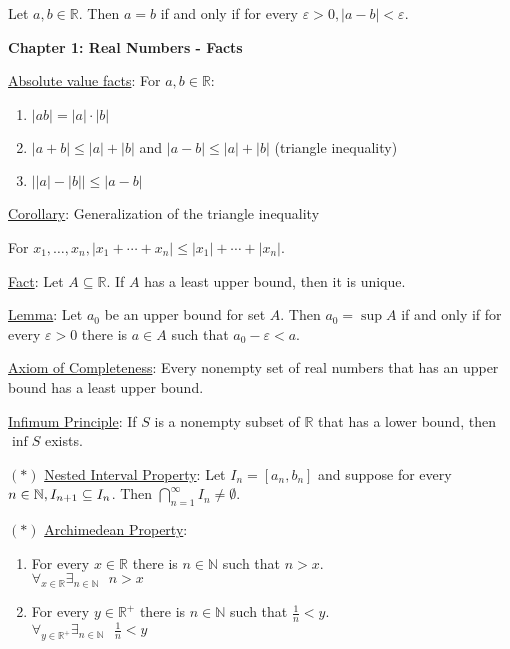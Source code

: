 \documentclass[12pt]{article}
\newcommand{\RR}{\mathbb{R}} %
\newcommand{\NN}{\mathbb{N}}
\newcommand\abs[1]{\left| #1 \right|} %
\newcommand{\eps}{\varepsilon}
\begin{document}
Let $a, b \in \RR$. Then $a = b$ if and only if for every $\eps > 0, \abs{a - b} < \eps$.

\pagebreak

\textbf{Chapter 1: Real Numbers - Facts}

\hrulefill

\underline{Absolute value facts}: For $a, b \in \RR$:
\begin{enumerate}
\item $\abs{ab} = \abs{a} \cdot \abs{b}$
\item $\abs{a + b} \le \abs{a} + \abs{b}$ and $\abs{a - b} \le \abs{a} + \abs{b}$ (triangle inequality)
\item $\abs{\abs{a} - \abs{b}} \le \abs{a - b}$
\end{enumerate}

\hrulefill

\underline{Corollary}: Generalization of the triangle inequality

For $x_1, \dots, x_n, \abs{x_1 + \cdots + x_n} \le \abs{x_1} + \cdots + \abs{x_n}$.

\hrulefill

\underline{Fact}: Let $A \subseteq \RR$. If $A$ has a least upper bound, then it is unique.

\hrulefill

\underline{Lemma}: Let $a_0$ be an upper bound for set $A$. Then $a_0 = \sup A$ if and only if for every $\eps > 0$ there is $a \in A$ such that $a_0 - \eps < a$.

\hrulefill

\underline{Axiom of Completeness}: Every nonempty set of real numbers that has an upper bound has a least upper bound.

\hrulefill

\underline{Infimum Principle}: If $S$ is a nonempty subset of $\RR$ that has a lower bound, then $\inf S$ exists.

\hrulefill

$(\ast)$ \underline{Nested Interval Property}: Let $I_n = [a_n, b_n]$ and suppose for every $n \in \NN,
\\
I_{n + 1} \subseteq I_n$. Then $\bigcap_{n = 1}^{\infty} I_n \ne \emptyset$.

\hrulefill

$(\ast)$ \underline{Archimedean Property}:

\begin{enumerate}
\item For every $x \in \RR$ there is $n \in \NN$ such that $n > x$.
\\
$\forall_{x \in \RR} \exists_{n \in \NN} \text{ } n > x$

\item For every $y \in \RR^{+}$ there is $n \in \NN$ such that $\frac{1}{n} < y$.
\\
$\forall_{y \in \RR^{+}} \exists_{n \in \NN} \text{ } \frac{1}{n} < y$
\end{enumerate}
\end{document}
